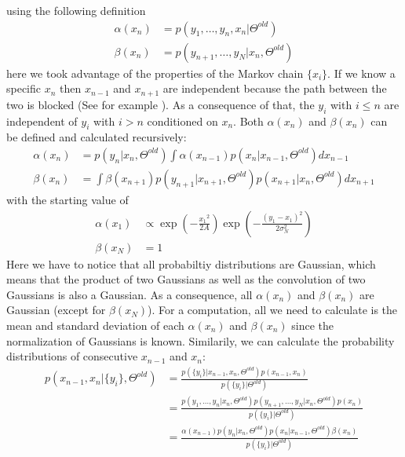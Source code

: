 \documentclass[%
 reprint,
 amsmath,amssymb,
 aps,
]{revtex4-1}
\begin{document}
using the following definition
\begin{equation}
	\begin{aligned}
	\alpha(x_{n})&=p(y_{1},\dots,y_{n},x_{n}|\Theta^{old})\\
	\beta(x_{n})&=p(y_{n+1},\dots,y_{N}|x_{n},\Theta^{old})
	\end{aligned}
\end{equation}
here we took advantage of the properties of the Markov chain $\{x_{i}\}$.  If we know a specific $x_{n}$ then $x_{n-1}$ and $x_{n+1}$ are independent because the path between the two is blocked (See for example \cite{RN90}).  As a consequence of that, the $y_{i}$ with $i\leq n$ are independent of $y_{i}$ with $i>n$ conditioned on $x_{n}$.  Both $\alpha(x_{n})$ and $\beta(x_{n})$ can be defined and calculated recursively:
\begin{equation}
	\begin{aligned}
	\alpha(x_{n})&=p(y_{n}|x_{n},\Theta^{old})\int \alpha(x_{n-1})p(x_{n}|x_{n-1},\Theta^{old})dx_{n-1}\\
	\beta(x_{n})&=\int \beta(x_{n+1})p(y_{n+1}|x_{n+1},\Theta^{old})p(x_{n+1}|x_{n},\Theta^{old})dx_{n+1}
	\end{aligned}
\end{equation}
with the starting value of
\begin{equation}
	\begin{aligned}
\alpha(x_{1})&\propto \exp \left( { - \frac{{x_1}^2}{2A}}\right)\exp \left( -\frac{{{{\left( {y_{1} - x_{1}} \right)}^2}}}{{2\sigma_{N}^{2}}} \right)\\
\beta(x_{N})&=1
	\end{aligned}
\end{equation}
Here we have to notice that all probabiltiy distributions are Gaussian, which means that the product of two Gaussians as well as the convolution of two Gaussians is also a Gaussian.  As a consequence, all $\alpha(x_{n})$ and $\beta(x_{n})$ are Gaussian (except for $\beta(x_{N})$).  For a computation, all we need to calculate is the mean and standard deviation of each $\alpha(x_{n})$ and $\beta(x_{n})$ since the normalization of Gaussians is known.  Similarily, we can calculate the probability distributions of consecutive $x_{n-1}$ and $x_{n}$:
\begin{equation}\label{margxnxnmone}
	\begin{aligned}
	p\left( x_{n-1},x_{n}|\{y_{i}\},\Theta^{old}\right)&=\frac{p\left( \{y_{i}\}|x_{n-1},x_{n},\Theta^{old}\right)p(x_{n-1},x_{n})}{p(\{y_{i}\}|\Theta^{old})}\\
	&=\frac{p(y_{1},\dots,y_{n}|x_{n},\Theta^{old})p(y_{n+1},\dots,y_{N}|x_{n},\Theta^{old})p(x_{n})}{p(\{y_{i}\}|\Theta^{old})}\\
	&=\frac{\alpha(x_{n-1})p(y_{n}|x_{n},\Theta^{old})p(x_{n}|x_{n-1},\Theta^{old})\beta(x_{n})}{p(\{y_{i}\}|\Theta^{old})}
	\end{aligned}
\end{equation}
\end{document}
